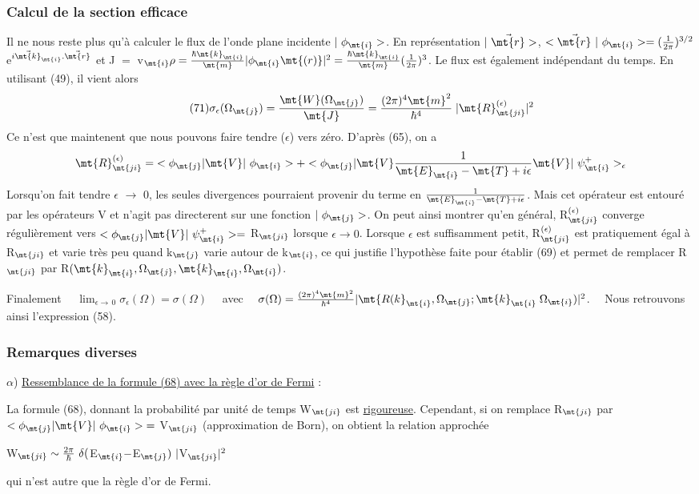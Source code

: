 \subsubsection{Calcul de la section efficace}%
Il ne nous reste plus qu'à calculer le flux de l'onde plane
incidente $|\ \phi_\mt{i}>$. En représentation $|\ \vec{\mt{r}}>$, $<\vec{\mt{r}}\ |\ \phi_\mt{i}>=
(\frac{1}{2\pi})^{3/2}$e$^{i\vec{\mt{k}}_\mt{i}.\vec{\mt{r}}}$ et J $=$ v$_\mt{i }\rho=
\frac{\hbar\mt{ k}_\mt{i}}{\mt{m}}|\phi_\mt{i}\mt{(r)}|^2=\frac{\hbar\mt{ k}_\mt{i}}{\mt{m}}(\frac{1}{2\pi})^3$.
Le flux est également indépendant du temps. En utilisant (49), il vient alors
\[
\tag{71}\sigma_\epsilon(\Omega_\mt{j})=\frac{\mt{W}(\Omega_\mt{j})}{\mt{J}}=\frac{(2\pi)^4\mt{m}^2}{\hbar^4}\;|\mt{R}_\mt{ji}^{(\epsilon)}|^2
\]
Ce n'est que maintenent que nous pouvons faire tendre ($\epsilon$) vers zéro.
D'après (65), on a
\[
\mt{R}_\mt{ji}^{(\epsilon)}=\;<\phi_\mt{j }|\mt{ V }|\ \phi_\mt{i}>+
<\phi_\mt{j }|\mt{ V }\frac{1}{\mt{E}_\mt{i}-\mt{T}+i\epsilon}\mt{ V }|\ \psi_\mt{i}^+>_\epsilon
\]
Lorsqu'on fait tendre $\epsilon$ $\to$ 0, les seules divergences pourraient provenir
du terme en $\frac{1}{\mt{E}_\mt{i}-\mt{T}+i\epsilon}$. Mais cet opérateur est entouré par les
opérateurs V et n'agit pas directerent sur une fonction $|\ \phi_\mt{j}>$.
On peut ainsi montrer qu'en général, R$_\mt{ji}^{(\epsilon)}$ converge régulièrement vers
$<\phi_\mt{j }|\mt{ V }|\ \psi_\mt{i}^+>=$ R$_\mt{ji}$
lorsque $\epsilon\to0$. Lorsque $\epsilon$ est suffisamment petit,
R$_\mt{ji}^{(\epsilon)}$ est pratiquement égal à R$_\mt{ji}$ et varie très peu quand k$_\mt{j}$ varie autour
de k$_\mt{i}$, ce qui justifie l'hypothèse faite pour établir (69) et permet de
remplacer R$_\mt{ji}$ par R$(\mt{k}_\mt{i},\Omega_\mt{j},\mt{k}_\mt{i},\Omega_\mt{i})$.

Finalement \ \ $\lim_{\epsilon\to\,0}\sigma_\epsilon(\Omega)=\sigma(\Omega)$ \ \ avec \ \ $\sigma(\Omega)=
\frac{(2\pi)^4\mt{m}^2}{\hbar^4}|\mt{R(k}_\mt{i},\Omega_\mt{j};\mt{k}_\mt{i}\;\Omega_\mt{i})|^2$. \ \ 
Nous retrouvons ainsi l'expression (58).

\subsubsection{Remarques diverses}%
$\alpha$) \ul{Ressemblance de la formule (68) avec la règle d'or de Fermi} :

La formule (68), donnant la probabilité par unité de temps W$_\mt{ji}$
est \ul{rigoureuse}. Cependant, si on remplace R$_\mt{ji}$ par
$<\phi_\mt{j }|\mt{ V }|\ \phi_\mt{i}>\;=$ V$_\mt{ji}$
(approximation de Born), on obtient la relation approchée
\begin{center}
W$_\mt{ji}\sim\frac{2\pi}{\hbar}\ \delta($E$_\mt{i}-$E$_\mt{j})\ |$V$_\mt{ji}|^2$
\end{center}
qui n'est autre que la règle d'or de Fermi.

